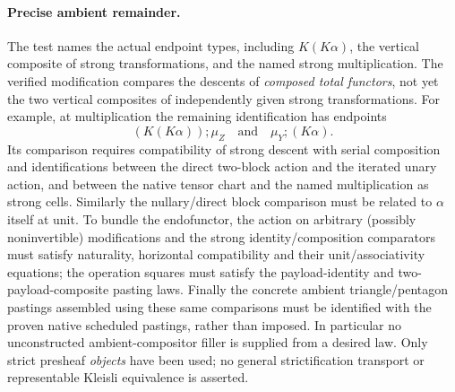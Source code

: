 \documentclass[11pt]{article}
\newcommand{\code}[1]{\texttt{\detokenize{#1}}}
\begin{document}
\paragraph{Precise ambient remainder.}
The test \code{checks/AmbientBoundary.lean} names the actual endpoint types, including $K(K\alpha)$, the vertical composite of strong transformations, and the named strong multiplication. The verified modification compares the descents of \emph{composed total functors}, not yet the two vertical composites of independently given strong transformations. For example, at multiplication the remaining identification has endpoints
\[
 (K(K\alpha));\mu_Z \quad\text{and}\quad \mu_Y;(K\alpha).
\]
Its comparison requires compatibility of strong descent with serial composition and identifications between the direct two-block action and the iterated unary action, and between the native tensor chart and the named multiplication as strong cells. Similarly the nullary/direct block comparison must be related to $\alpha$ itself at unit. To bundle the endofunctor, the action on arbitrary (possibly noninvertible) modifications and the strong identity/composition comparators must satisfy naturality, horizontal compatibility and their unit/associativity equations; the operation squares must satisfy the payload-identity and two-payload-composite pasting laws. Finally the concrete ambient triangle/pentagon pastings assembled using these same comparisons must be identified with the proven native scheduled pastings, rather than imposed. In particular no unconstructed ambient-compositor filler is supplied from a desired law. Only strict presheaf \emph{objects} have been used; no general strictification transport or representable Kleisli equivalence is asserted.
\end{document}
